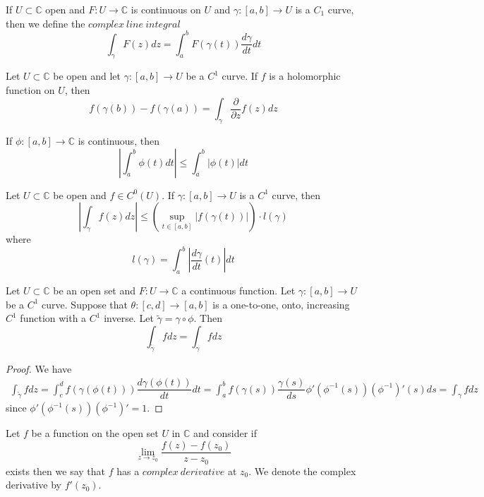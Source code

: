 \documentclass[lang=en, color=blue, ]{elegantbook}
\newcommand{\C}{\mathbb{C}}
\newcommand{\ParZ}{\dfrac{\partial}{\partial z}}
\begin{document}
\begin{definition}
    If $U\subset \C$ open and $F:U\to\C$ is continuous on $U$ and $\gamma:[a,b]\to U$ is a $C_1$ curve, then we define the $complex\ line\ integral$
    \[\int_{\gamma} F(z)dz = \int_a^b F(\gamma(t))\dfrac{d\gamma}{dt}dt\]
\end{definition}

\begin{proposition}
    Let $U\subset \C$ be open and let $\gamma:[a,b]\to U$ be a $C^1$ curve. If $f$ is a holomorphic function on $U$, then
    \[f(\gamma(b)) - f(\gamma(a)) = \int_{\gamma} \ParZ f(z)dz\]
\end{proposition}

\begin{proposition}
If $\phi:[a,b] \to \C$ is continuous, then
\[|\int_a^b \phi(t)dt|\leq \int_a^b |\phi(t)|dt\]
\end{proposition}

\begin{proposition}
Let $U \subset \C$ be open and $f\in C^0(U)$. If $\gamma:[a,b]\to U$ is a $C^1$ curve, then
\[|\int_{\gamma} f(z)dz| \leq (\sup_{t\in[a,b]} |f(\gamma(t))|)\cdot l(\gamma)\]
where
\[l(\gamma) = \int_a^b |\dfrac{d\gamma}{dt}(t)|dt\]
\end{proposition}

\begin{proposition}
    Let $U\subset \C$ be an open set and $F:U\to\C$ a continuous function. Let $\gamma:[a,b]\to U$ be a $C^1$ curve. Suppose that $\theta: [c,d]\to[a,b]$ is a one-to-one, onto, increasing $C^1$ function with a $C^1$ inverse. Let $\tilde{\gamma} = \gamma \circ \phi$. Then
    \[\int_{\tilde{\gamma}} fdz = \int_{\gamma} fdz\]
\end{proposition}
\begin{proof}\par
    We have
    \[
    \begin{aligned}
        \int_{\tilde{\gamma}} fdz = \int_c^d f(\gamma(\phi(t))) \dfrac{d\gamma(\phi(t))}{dt} dt = \int_a^b f(\gamma(s)) \dfrac{\gamma(s)}{ds} \phi'(\phi^{-1}(s)) (\phi^{-1})'(s)ds = \int_{\gamma} fdz
    \end{aligned}
    \]
    since $\phi'(\phi^{-1}(s))(\phi^{-1})' = 1$.
\end{proof}

\begin{definition}
    Let $f$ be a function on the open set $U$ in $\C$ and consider if 
    \[\lim_{z\to z_0} \dfrac{f(z)-f(z_0)}{z-z_0}\]
    exists then we say that $f$ has a $complex\ derivative$ at $z_0$. We denote the complex derivative by $f'(z_0)$. 
\end{definition}
\end{document}
